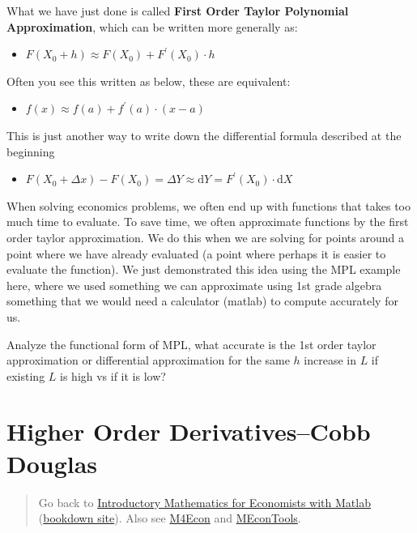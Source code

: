 \documentclass[
]{book}
\providecommand{\tightlist}{%
  \setlength{\itemsep}{0pt}\setlength{\parskip}{0pt}}
\begin{document}
What we have just done is called \textbf{First Order Taylor Polynomial
Approximation}, which can be written more generally as:

\begin{itemize}
\tightlist
\item
  \(\displaystyle F(X_0 +h)\approx F(X_0 )+F^{\prime } (X_0 )\cdot h\)
\end{itemize}

Often you see this written as below, these are equivalent:

\begin{itemize}
\tightlist
\item
  \(\displaystyle f(x)\approx f(a)+f^{\prime } (a)\cdot (x-a)\)
\end{itemize}

This is just another way to write down the differential formula
described at the beginning

\begin{itemize}
\tightlist
\item
  \(\displaystyle F(X_0 +\Delta x)-F(X_0 )=\Delta Y\approx \textrm{d}Y=F^{\prime } (X_0 )\cdot \textrm{d}X\)
\end{itemize}

When solving economics problems, we often end up with functions that
takes too much time to evaluate. To save time, we often approximate
functions by the first order taylor approximation. We do this when we
are solving for points around a point where we have already evaluated (a
point where perhaps it is easier to evaluate the function). We just
demonstrated this idea using the MPL example here, where we used
something we can approximate using 1st grade algebra something that we
would need a calculator (matlab) to compute accurately for us.

Analyze the functional form of MPL, what accurate is the 1st order
taylor approximation or differential approximation for the same \(h\)
increase in \(L\) if existing \(L\) is high vs if it is low?

\hypertarget{higher-order-derivativescobb-douglas}{%
\section{Higher Order Derivatives--Cobb Douglas}\label{higher-order-derivativescobb-douglas}}

\begin{quote}
Go back to \href{https://math4econ.github.io/}{Introductory Mathematics for Economists with Matlab} (\href{https://math4econ.github.io/bookdown}{bookdown site}). Also see \href{http://fanwangecon.github.io/M4Econ}{M4Econ} and \href{https://fanwangecon.github.io/MEconTools/}{MEconTools}.
\end{quote}
\end{document}
